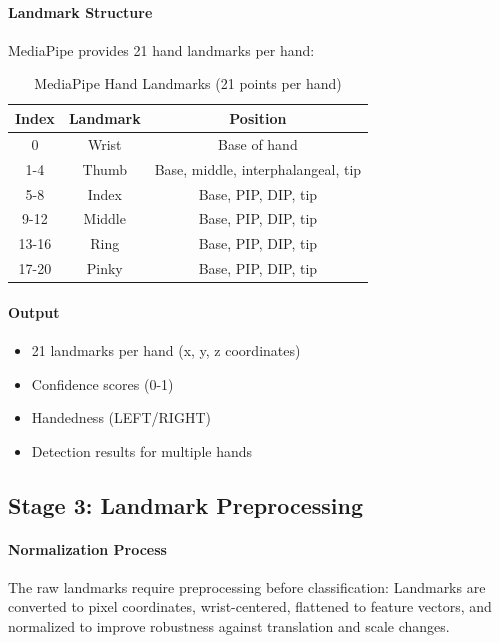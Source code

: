 \paragraph{Landmark Structure}

MediaPipe provides 21 hand landmarks per hand:

\begin{table}[H]
\centering
\begin{tabular}{|c|c|c|}
\hline
\textbf{Index} & \textbf{Landmark} & \textbf{Position} \\
\hline
0 & Wrist & Base of hand \\
\hline
1-4 & Thumb & Base, middle, interphalangeal, tip \\
\hline
5-8 & Index & Base, PIP, DIP, tip \\
\hline
9-12 & Middle & Base, PIP, DIP, tip \\
\hline
13-16 & Ring & Base, PIP, DIP, tip \\
\hline
17-20 & Pinky & Base, PIP, DIP, tip \\
\hline
\end{tabular}
\caption{MediaPipe Hand Landmarks (21 points per hand)}
\end{table}

\paragraph{Output}
\begin{itemize}
    \item 21 landmarks per hand (x, y, z coordinates)
    \item Confidence scores (0-1)
    \item Handedness (LEFT/RIGHT)
    \item Detection results for multiple hands
\end{itemize}

\subsection{Stage 3: Landmark Preprocessing}

\paragraph{Normalization Process}

The raw landmarks require preprocessing before classification:
Landmarks are converted to pixel coordinates, wrist-centered, flattened to feature vectors, and normalized to improve robustness against translation and scale changes.

